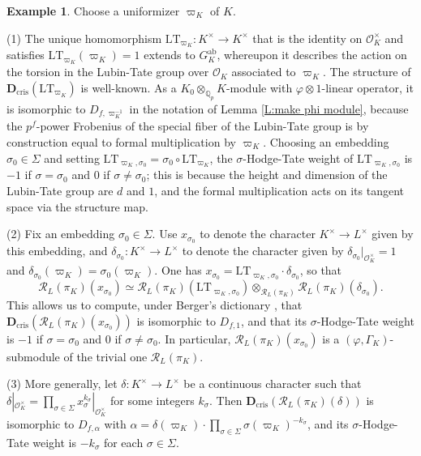\documentclass[12pt]{article}
\theoremstyle{definition}
\newtheorem{example}[theorem]{Example}
\numberwithin{equation}{theorem}
\newcommand{\calO}{\mathcal{O}}
\newcommand{\calR}{\mathcal{R}}
\newcommand{\QQ}{\mathbb{Q}}
\newcommand{\bbD}{\mathbf{D}}
\newcommand{\cris}{\mathrm{cris}}
\newcommand{\LT}{\mathrm{LT}}
\def\Qp{\QQ_p}
\begin{document}
\begin{example}
\label{Ex:rank one modules}  Choose a uniformizer $\varpi_K$ of $K$.

(1) The unique homomorphism $\LT_{\varpi_K}: K^\times \to K^\times$ that is the identity on $\calO_K^\times$ and satisfies $\LT_{\varpi_K}(\varpi_K) = 1$ extends to $G_K^\mathrm{ab}$, whereupon it describes the action on the torsion in the Lubin-Tate group over $\calO_K$ associated to $\varpi_K$.  The structure of $\bbD_\cris(\LT_{\varpi_K})$ is well-known.  As a $K_0 \otimes_{\Qp} K$-module with $\varphi \otimes 1$-linear operator, it is isomorphic to $D_{f,\varpi_K^{-1}}$ in the notation of Lemma \ref{L:make phi module}, because the $p^f$-power Frobenius of the special fiber of the Lubin-Tate group is by construction equal to formal multiplication by $\varpi_K$.  Choosing an embedding $\sigma_0 \in \Sigma$ and setting $\LT_{\varpi_K,\sigma_0} = \sigma_0 \circ \LT_{\varpi_K}$, the $\sigma$-Hodge-Tate weight of $\LT_{\varpi_K,\sigma_0}$ is $-1$ if $\sigma=\sigma_0$ and $0$ if $\sigma \neq \sigma_0$; this is because the height and dimension of the Lubin-Tate group are $d$ and $1$, and the formal multiplication acts on its tangent space via the structure map.

(2) Fix an embedding $\sigma_0 \in \Sigma$.  Use $x_{\sigma_0}$ to denote the character $K^\times \to L^\times$ given by this embedding, and $\delta_{\sigma_0}: K^\times \to L^\times$ to denote the character given by $\delta_{\sigma_0}|_{\calO_K^\times} = 1$ and $\delta_{\sigma_0}(\varpi_K) = \sigma_0(\varpi_K)$.  One has $x_{\sigma_0} = \LT_{\varpi_K, \sigma_0} \cdot \delta_{\sigma_0}$, so that
\[
\calR_L(\pi_K)(x_{\sigma_0}) \simeq \calR_L(\pi_K)(\LT_{\varpi_K,\sigma_0}) \otimes_{\calR_L(\pi_K)} \calR_L(\pi_K)(\delta_{\sigma_0}).
\]
This allows us to compute, under Berger's dictionary \cite[Th\'eor\`eme~A]{berger-dictionary}, that $\bbD_\cris(\calR_L(\pi_K)(x_{\sigma_0}))$ is isomorphic to $D_{f,1}$, and that its $\sigma$-Hodge-Tate weight is $-1$ if $\sigma=\sigma_0$ and $0$ if $\sigma \neq \sigma_0$.  In particular, $\calR_L(\pi_K)(x_{\sigma_0})$ is a $(\varphi, \Gamma_K)$-submodule of the trivial one $\calR_L(\pi_K)$.

(3) More generally, let $\delta: K^\times \to L^\times$ be a continuous character such that $\delta|_{\calO_K^\times} = \prod_{\sigma \in \Sigma} x_\sigma^{k_\sigma}|_{\calO_K^\times}$ for some integers $k_\sigma$.
Then $\bbD_\cris(\calR_L(\pi_K)(\delta))$ is isomorphic to $D_{f,\alpha}$ with $\alpha = \delta(\varpi_K) \cdot \prod_{\sigma \in \Sigma} \sigma(\varpi_K)^{-k_\sigma}$, and its $\sigma$-Hodge-Tate weight is $-k_\sigma$ for each $\sigma \in \Sigma$.
\end{example}
\end{document}
